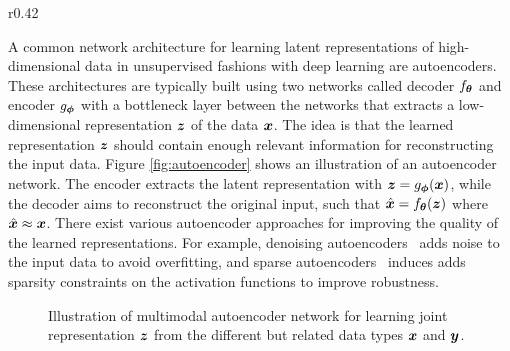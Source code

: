 \begin{wrapfigure}{r}{0.42\textwidth}
	\centering
	\vspace{-3mm}
	\resizebox{0.39\textwidth}{!}{
		
	}
	\captionsetup{width=.9\linewidth}
	\caption{Illustration of an autoencoder network.}
	\label{fig:autoencoder}
	\vspace{-3mm}
\end{wrapfigure}
A common network architecture for learning latent representations of high-dimensional data in unsupervised fashions with deep learning are autoencoders. These architectures are typically built using two networks called decoder $f_{{\bm{\theta}}}$ and encoder $g_{{\bm{\phi}}}$ with a bottleneck layer between the networks that extracts a low-dimensional representation ${\bm{z}}$ of the data ${\bm{x}}$. The idea is that the learned representation ${\bm{z}}$ should contain enough relevant information for reconstructing the input data. Figure \ref{fig:autoencoder} shows an illustration of an autoencoder network. The encoder extracts the latent representation with ${\bm{z}} = g_{{\bm{\phi}}}({\bm{x}})$, while the decoder aims to reconstruct the original input, such that $\hat{{\bm{x}}} = f_{{\bm{\theta}}}({\bm{z}})$ where $\hat{{\bm{x}}} \approx {\bm{x}}$. There exist various autoencoder approaches for improving the quality of the learned representations. For example, denoising autoencoders~\cite{vincent2008extracting} adds noise to the input data to avoid overfitting, and sparse autoencoders~\cite{ng2011sparse} induces adds sparsity constraints on the activation functions to improve robustness.




\begin{figure}[t]
	\centering
	\resizebox{0.6\textwidth}{!}{
		
	}
	\caption{Illustration of multimodal autoencoder network for learning joint representation ${\bm{z}}$ from the different but related data types ${\bm{x}}$ and ${\bm{y}}$. 
	}
	\label{fig:multimodal_autoencoder}
	\vspace{-3mm}
\end{figure}

